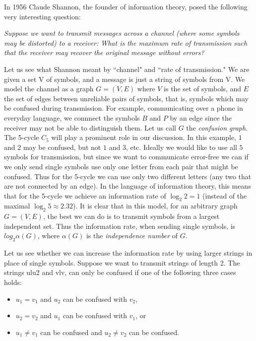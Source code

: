 In 1956 Claude Shannon, the founder of information theory, posed the following very interesting question:

\begin{myquote}
\textit{Suppose we want to transmit messages across a channel (where
some symbols may be distorted) to a receiver: What is the maximum
rate of transmission such that the receiver may recover the original
message without errors?}
\end{myquote}

Let us see what Shannon meant by ``channel" and ``rate of transmission." 
We are given a set V of symbols, and a message is just a string of symbols 
from V. We model the channel as a graph $G = (V,E)$  where $V$ is the set 
of symbols, and $E$ the set of edges between unreliable pairs of symbols, 
that is, symbols which may be confused during transmission. For example, 
communicating over a phone in everyday language, we connnect the symbols
$B$ and $P$ by an edge since the receiver may not be able to distinguish 
them. Let us call $G$ the \textit{confusion graph}.
The 5-cycle $C_5$ will play a prominent role in our discussion. In this example,
$1$ and $2$ may be confused, but not $1$ and $3$, etc. Ideally we would like 
to use all $5$ symbols for transmission, but since we want to communicate error-free we can 
if we only send single symbols use only one letter from each pair that might
be confused. Thus for the 5-cycle we can use only two different letters
(any two that are not connected by an edge). In the language of information theory,
this means that for the 5-cycle we achieve an information rate of
$\log_2 2 = 1$ (instead of the maximal $\log_2 5 \approx 2.32$). It is clear that in this model,
for an arbitrary graph $G = (V, E)$, the best we can do is to transmit symbols from
a largest independent set. Thus the information rate, when sending single symbols,
is $log_2 \alpha(G)$, where $\alpha(G)$ is the \textit{independence number} of $G$.

Let us see whether we can increase the information rate by using larger 
strings in place of single symbols. Suppose we want to transmit strings of 
length 2. The strings ulu2 and vlv, can only be confused if one of the 
following three cases holds: 

\begin{itemize}[leftmargin=12pt]
  \item $u_1 = v_1$ and $u_2$ can be confused with $v_2$,
  \item $u_2 = v_2$ and $u_1$ can be confused with $v_1$, or
  \item $u_1 \neq v_1$ can be confused and $u_2 \neq v_2$ can be confused. 
\end{itemize}

